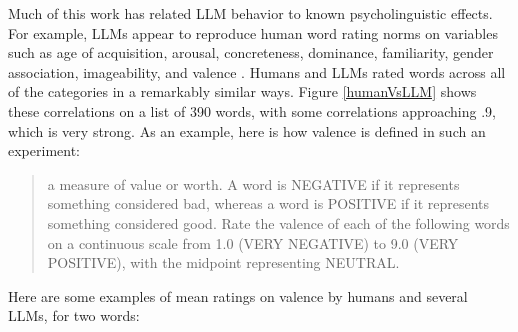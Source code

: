 
Much of this work has related LLM behavior to known psycholinguistic effects.
For example, LLMs appear to reproduce human word rating norms on variables such
as  age of acquisition, arousal, concreteness, dominance, familiarity, gender
association, imageability, and valence \cite{trott2024augment,
kello2024emergent}. Humans and LLMs rated words across all of the categories in
a remarkably similar ways. Figure \ref{humanVsLLM} shows these
correlations on a list of 390 words, with some correlations approaching .9,
which is very strong.  As an example, here is how valence is defined in such an
experiment:
\begin{quote}
a measure of value or worth. A word is NEGATIVE if it represents something
considered bad, whereas a word is POSITIVE if it represents something
considered good. Rate the valence of each of the following words on a
continuous scale from 1.0 (VERY NEGATIVE) to 9.0 (VERY POSITIVE), with the
midpoint representing NEUTRAL.
\end{quote}
Here are some examples of mean ratings on valence by humans and several LLMs,
for two words:

